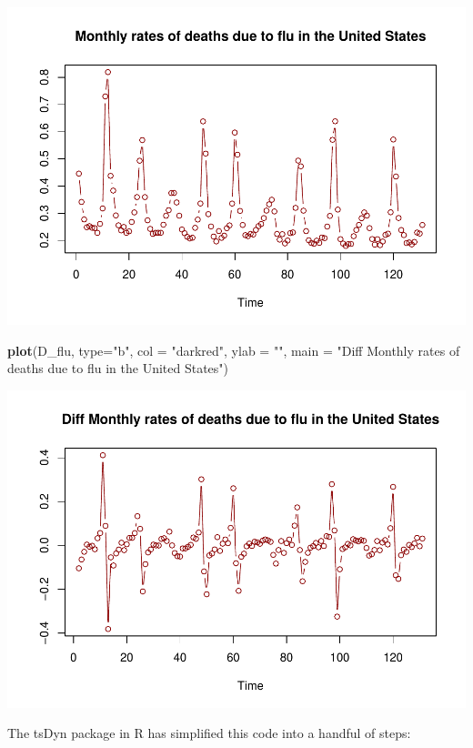 \documentclass[
]{book}
\newenvironment{Shaded}{\begin{snugshade}}{\end{snugshade}}
\newcommand{\AttributeTok}[1]{\textcolor[rgb]{0.13,0.29,0.53}{#1}}
\newcommand{\FunctionTok}[1]{\textcolor[rgb]{0.13,0.29,0.53}{\textbf{#1}}}
\newcommand{\NormalTok}[1]{#1}
\newcommand{\StringTok}[1]{\textcolor[rgb]{0.31,0.60,0.02}{#1}}
\begin{document}
\includegraphics{Notas-Series-Tiempo_files/figure-latex/unnamed-chunk-56-1.pdf}

\begin{Shaded}
\begin{Highlighting}[]
\FunctionTok{plot}\NormalTok{(D\_flu, }\AttributeTok{type=}\StringTok{"b"}\NormalTok{, }\AttributeTok{col =} \StringTok{"darkred"}\NormalTok{, }\AttributeTok{ylab =} \StringTok{""}\NormalTok{, }
     \AttributeTok{main =} \StringTok{"Diff Monthly rates of deaths due to flu in the United States"}\NormalTok{)}
\end{Highlighting}
\end{Shaded}

\includegraphics{Notas-Series-Tiempo_files/figure-latex/unnamed-chunk-56-2.pdf}

The tsDyn package in R has simplified this code into a handful of steps:
\end{document}
